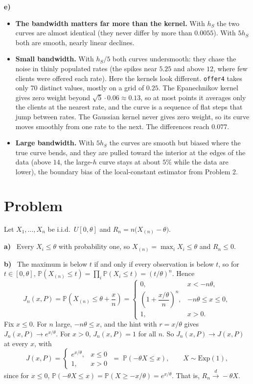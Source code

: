\documentclass[11pt]{article}
\newcommand{\Prob}{\mathbb{P}}
\theoremstyle{plain}
\newcounter{problem}
\renewcommand{\theproblem}{\arabic{problem}}
\newcommand{\problem}{
	\stepcounter{problem}
	\section*{Problem \theproblem}
}
\newcommand{\itm}[1]{\par\textbf{#1)}\ }
\begin{document}
\itm{e}
\begin{itemize}
	\item \textbf{The bandwidth matters far more than the kernel.} With $h_S$ the two curves are almost identical (they never differ by more than $0.0055$). With $5h_S$ both are smooth, nearly linear declines.
	\item \textbf{Small bandwidth.} With $h_S/5$ both curves undersmooth: they chase the noise in thinly populated rates (the spikes near $5.25$ and above $12$, where few clients were offered each rate). Here the kernels look different. \texttt{offer4} takes only 70 distinct values, mostly on a grid of $0.25$. The Epanechnikov kernel gives zero weight beyond $\sqrt5\cdot 0.06\approx 0.13$, so at most points it averages only the clients at the nearest rate, and the curve is a sequence of flat steps that jump between rates. The Gaussian kernel never gives zero weight, so its curve moves smoothly from one rate to the next. The differences reach $0.077$.
	\item \textbf{Large bandwidth.} With $5h_S$ the curves are smooth but biased where the true curve bends, and they are pulled toward the interior at the edges of the data (above $14$, the large-$h$ curve stays at about $5\%$ while the data are lower), the boundary bias of the local-constant estimator from Problem 2.
\end{itemize}



\problem

Let $X_1,\dots,X_n$ be i.i.d.\ $U[0,\theta]$ and $R_n = n\big(X_{(n)}-\theta\big)$.

\itm{a}
Every $X_i\le\theta$ with probability one, so $X_{(n)}=\max_iX_i\le\theta$ and $R_n\le 0$.

\itm{b}
The maximum is below $t$ if and only if every observation is below $t$, so for $t\in[0,\theta]$, $\Prob(X_{(n)}\le t) = \prod_i\Prob(X_i\le t) = (t/\theta)^n$. Hence
\[
J_n(x,P) = \Prob\left(X_{(n)}\le\theta+\frac xn\right) =
\begin{cases}
0, & x< -n\theta,\\[2pt]
\left(1+\dfrac{x/\theta}{n}\right)^{n}, & -n\theta\le x\le 0,\\[8pt]
1, & x> 0.
\end{cases}
\]
Fix $x\le 0$. For $n$ large, $-n\theta\le x$, and the hint with $r=x/\theta$ gives $J_n(x,P)\to e^{x/\theta}$. For $x>0$, $J_n(x,P)=1$ for all $n$. So $J_n(x,P)\to J(x,P)$ at every $x$, with
\[
J(x,P) = \begin{cases} e^{x/\theta}, & x\le 0\\ 1, & x>0\end{cases}
\;=\; \Prob(-\theta X\le x),\qquad X\sim\mathrm{Exp}(1),
\]
since for $x\le 0$, $\Prob(-\theta X\le x) = \Prob(X\ge -x/\theta) = e^{x/\theta}$. That is, $R_n\xrightarrow{d}-\theta X$.
\end{document}
